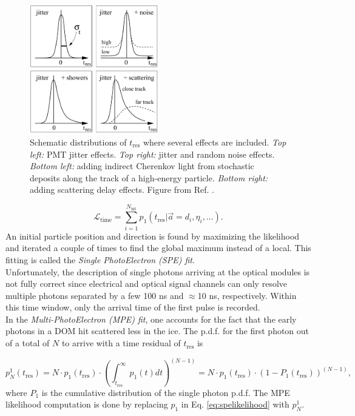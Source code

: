 \begin{figure}[t]
\centering
\includegraphics[width=0.5\textwidth]{chapter7/img/spempejitter.png}
\caption{Schematic distributions of $t_\textrm{res}$ where several effects are included. \textit{Top left: }PMT jitter effects. \textit{Top right: }jitter and random noise effects. \textit{Bottom left: }adding indirect Cherenkov light from stochastic deposits along the track of a high-energy particle. \textit{Bottom right: }adding scattering delay effects. Figure from Ref. \cite{Ahrens:2003fg}.}
\label{fig:spempejitter}
\end{figure}

\begin{equation}
\label{eq:spelikelihood}
\mathcal{L}_\textrm{time} = \sum^{N_\textrm{hit}}_{i=1} p_1 (t_\textrm{res} | \vec{a} = {d_i,\eta_i,...}).
\end{equation}
\noindent An initial particle position and direction is found by maximizing the likelihood and iterated a couple of times to find the global maximum instead of a local. This fitting is called the \textit{Single PhotoElectron (SPE) fit}.\\

\noindent Unfortunately, the description of single photons arriving at the optical modules is not fully correct since electrical and optical signal channels can only resolve multiple photons separated by a few 100 ns and $\approx$10 ns, respectively. Within this time window, only the arrival time of the first pulse is recorded.\\

\noindent In the \textit{Multi-PhotoElectron (MPE) fit}, one accounts for the fact that the early photons in a DOM hit scattered less in the ice. The p.d.f. for the first photon out of a total of $N$ to arrive with a time residual of $t_\textrm{res}$ is

\begin{equation}
p^1_N (t_\textrm{res}) = N \cdot p_1(t_\textrm{res}) \cdot \left(\int^\infty_{t_\textrm{res}} p_1(t) dt \right)^{(N-1)} = N \cdot p_1 (t_\textrm{res}) \cdot (1-P_1 (t_\textrm{res}))^{(N-1)},
\end{equation}
\noindent where $P_1$ is the cumulative distribution of the single photon p.d.f. The MPE likelihood computation is done by replacing $p_1$ in Eq. \ref{eq:spelikelihood} with $p^1_N$.\\

